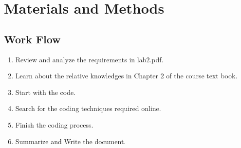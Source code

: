 \documentclass[letterpaper,10pt,english]{sphinxmanual}
\begin{document}
\chapter{Materials and Methods}
\label{\detokenize{index:materials-and-methods}}

\section{Work Flow}
\label{\detokenize{index:work-flow}}\begin{enumerate}
%
\item {} 
Review and analyze the requirements in lab2.pdf.

\item {} 
Learn about the relative knowledges in Chapter 2 of the course text book.

\item {} 
Start with the code.

\item {} 
Search for the coding techniques required online.

\item {} 
Finish the coding process.

\item {} 
Summarize and Write the document.

\end{enumerate}
\end{document}
